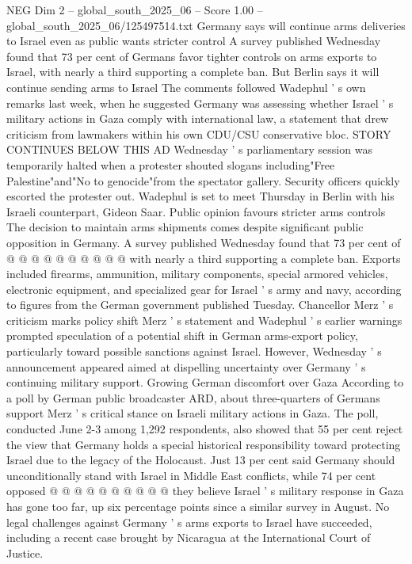 \begin{textsample}{NEG Dim 2 – global\_south\_2025\_06 – Score 1.00 – global\_south\_2025\_06/125497514.txt}  \label{ex:f2_neg_360}
Germany says will continue arms deliveries to Israel even as public wants stricter control A survey published Wednesday found that 73 per cent of Germans favor tighter controls on arms exports to Israel, with nearly a third supporting a complete ban.
But Berlin says it will continue sending arms to Israel The comments followed Wadephul ' s own remarks last week, when he suggested Germany was assessing whether Israel ' s military actions in Gaza comply with international law, a statement that drew criticism from lawmakers within his own CDU/CSU conservative bloc.
STORY CONTINUES BELOW THIS AD Wednesday ' s parliamentary session was temporarily halted when a protester shouted slogans including"Free Palestine"and"No to genocide"from the spectator gallery.
Security officers quickly escorted the protester out.
Wadephul is set to meet Thursday in Berlin with his Israeli counterpart, Gideon Saar.
Public opinion favours stricter arms controls The decision to maintain arms shipments comes despite significant public opposition in Germany.
A survey published Wednesday found that 73 per cent of @ @ @ @ @ @ @ @ @ @ with nearly a third supporting a complete ban.
Exports included firearms, ammunition, military components, special armored vehicles, electronic equipment, and specialized gear for Israel ' s army and navy, according to figures from the German government published Tuesday.
Chancellor Merz ' s criticism marks policy shift Merz ' s statement and Wadephul ' s earlier warnings prompted speculation of a potential shift in German arms-export policy, particularly toward possible sanctions against Israel.
However, Wednesday ' s announcement appeared aimed at dispelling uncertainty over Germany ' s continuing military support.
Growing German discomfort over Gaza According to a poll by German public broadcaster ARD, about three-quarters of Germans support Merz ' s critical stance on Israeli military actions in Gaza.
The poll, conducted June 2-3 among 1,292 respondents, also showed that 55 per cent reject the view that Germany holds a special historical responsibility toward protecting Israel due to the legacy of the Holocaust.
Just 13 per cent said Germany should unconditionally stand with Israel in Middle East conflicts, while 74 per cent opposed @ @ @ @ @ @ @ @ @ @ they believe Israel ' s military response in Gaza has gone too far, up six percentage points since a similar survey in August.
No legal challenges against Germany ' s arms exports to Israel have succeeded, including a recent case brought by Nicaragua at the International Court of Justice.

\end{textsample}

